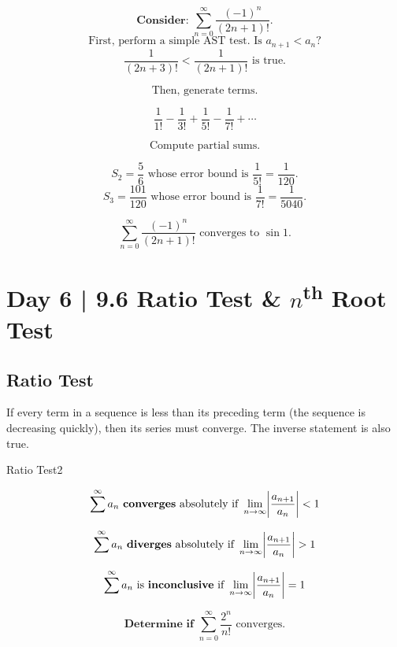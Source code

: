 \documentclass{article}
\theoremstyle{definition}
\DeclarePairedDelimiter{\abs}{\lvert}{\rvert}
\begin{document}
\vspace{0.5 cm}


\[ \textbf{Consider: } \sum_{n=0}^{\infty} \frac{(-1)^n}{(2n+1)!}.\] 
\[\text{First, perform a simple AST test. Is } a_{n+1}<a_n?\]
\[\frac{1}{(2n+3)!}<\frac{1}{(2n+1)!} \text{ is true.}\]

\[\text{Then, generate terms.}\]


\[\frac{1}{1!} - \frac{1}{3!} + \frac{1}{5!} - \frac{1}{7!} + \cdots\]

\[\text{Compute partial sums.}\]

\[S_2=\frac{5}{6} \text{ whose error bound is } \frac{1}{5!}=\frac{1}{120}.\]
\[S_3=\frac{101}{120} \text{ whose error bound is } \frac{1}{7!}=\frac{1}{5040}.\]

\vspace{1cm}

\[\sum_{n=0}^{\infty} \frac{(-1)^n}{(2n+1)!} \text{ converges to } \sin 1.\]



\section{Day 6 | 9.6 Ratio Test \& $n$\textsuperscript{th} Root Test}
\vspace{0.3cm}
\subsection{Ratio Test}
If every term in a sequence is less than its preceding term (the sequence is decreasing quickly), then its series must converge. The inverse statement is also true. 

\begin{theorem}{Ratio Test}{2}

\[\sum^{\infty} a_n \text{ \textbf{converges} absolutely if } \lim_{n \to \infty} \abs*{\frac{a_{n+1}}{a_n}} < 1\]

\[\sum^{\infty} a_n \text{ \textbf{diverges} absolutely  if } \lim_{n \to \infty} \abs*{ \frac{a_{n+1}}{a_n}} > 1\]

\[\sum^{\infty} a_n \text{ is \textbf{inconclusive} if } \lim_{n \to \infty} \abs*{\frac{a_{n+1}}{a_n}} = 1\]

\end{theorem}

\vspace{0.5 cm}

\[ \textbf{Determine if } \sum_{n=0}^{\infty} \frac{2^n}{n!} \text{ converges.}\]
\end{document}
